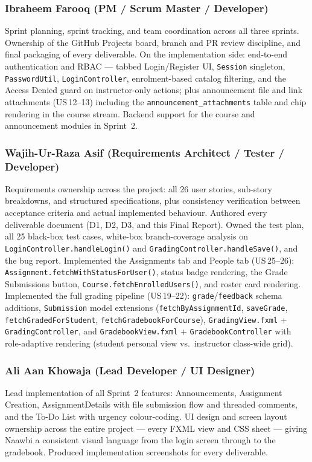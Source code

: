 \documentclass[12pt, a4paper]{article}
\begin{document}
{\sloppy
\subsubsection*{Ibraheem Farooq \normalfont\small\color{muted}(PM / Scrum Master / Developer)}
Sprint planning, sprint tracking, and team coordination across all three
sprints. Ownership of the GitHub Projects board, branch and PR review
discipline, and final packaging of every deliverable. On the implementation
side: end-to-end authentication and RBAC --- tabbed Login/Register UI,
\texttt{Session} singleton, \texttt{PasswordUtil}, \texttt{LoginController},
enrolment-based catalog filtering, and the Access Denied guard on
instructor-only actions; plus announcement file and link attachments
(US\,12--13) including the \texttt{announcement\_attachments} table and chip
rendering in the course stream. Backend support for the course and
announcement modules in Sprint~2.

\subsubsection*{Wajih-Ur-Raza Asif \normalfont\small\color{muted}(Requirements Architect / Tester / Developer)}
Requirements ownership across the project: all 26 user stories, sub-story
breakdowns, and structured specifications, plus consistency verification
between acceptance criteria and actual implemented behaviour. Authored every
deliverable document (D1, D2, D3, and this Final Report). Owned the test
plan, all 25 black-box test cases, white-box branch-coverage analysis on
\texttt{LoginController.handleLogin()} and \texttt{GradingController.handleSave()},
and the bug report. Implemented the Assignments tab and People tab
(US\,25--26): \texttt{Assignment.fetchWithStatusForUser()}, status badge
rendering, the Grade Submissions button, \texttt{Course.fetchEnrolledUsers()},
and roster card rendering. Implemented the full grading pipeline
(US\,19--22): \texttt{grade}/\texttt{feedback} schema additions,
\texttt{Submission} model extensions
(\texttt{fetchByAssignmentId}, \texttt{saveGrade}, \texttt{fetchGradedForStudent},
\texttt{fetchGradebookForCourse}), \texttt{GradingView.fxml} +
\texttt{GradingController}, and \texttt{GradebookView.fxml} +
\texttt{GradebookController} with role-adaptive rendering (student personal
view vs.\ instructor class-wide grid).

\subsubsection*{Ali Aan Khowaja \normalfont\small\color{muted}(Lead Developer / UI Designer)}
Lead implementation of all Sprint~2 features: Announcements, Assignment
Creation, AssignmentDetails with file submission flow and threaded comments,
and the To-Do List with urgency colour-coding. UI design and screen layout
ownership across the entire project --- every FXML view and CSS sheet ---
giving Naawbi a consistent visual language from the login screen through to
the gradebook. Produced implementation screenshots for every deliverable.
\par}
\end{document}

